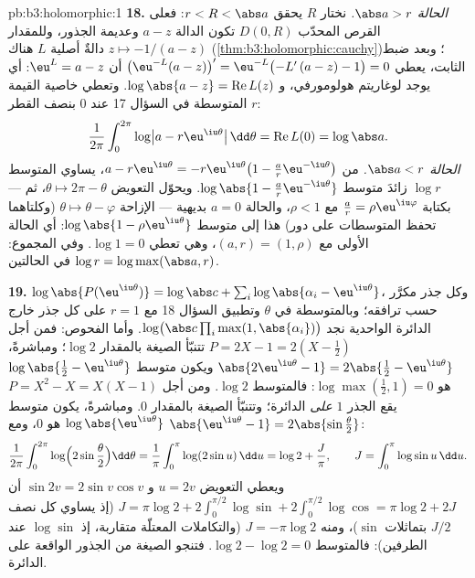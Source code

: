 \begin{solution}{pb:b3:holomorphic:1}
\textbf{18.} \emph{الحالة $\abs a > r$.} نختار $R$ يحقق $r < R
< \abs a$:
فعلى القرص المحدّب $D(0, R)$ تكون الدالة $a - z$ 
وعديمة الجذور، وللمقدار $z \mapsto -1/(a - z)$ دالةٌ أصلية $L$ هناك
(\cref{thm:b3:holomorphic:cauchy})؛ وبعد ضبط الثابت، يعطي $\bigl(\eu^{-L}(a -
z)\bigr)' = \eu^{-L}\bigl(-L'\,(a - z) - 1\bigr) = 0$ أن $\eu^L = a - z$:
أي يوجد لوغاريتم هولومورفي، و $\log\abs{a - z} = \operatorname{Re}L(z)$. وتعطي خاصية القيمة
المتوسطة في السؤال 17 عند $0$ بنصف القطر $r$:
\[
\frac1{2\pi}\int_0^{2\pi}
\log\bigl|a - r\eu^{\iu\theta}\bigr|\,\dd\theta
= \operatorname{Re}L(0) = \log\abs a .
\]
\emph{الحالة $\abs a < r$.} من $a - r\eu^{\iu\theta} =
-r\eu^{\iu\theta}\bigl(1 - \frac ar\eu^{-\iu\theta}\bigr)$، يساوي المتوسط $\log r$
زائدَ متوسط $\log\abs{1 -
\frac ar\eu^{-\iu\theta}}$. ويحوّل التعويض $\theta \mapsto
2\pi - \theta$، ثم --- بكتابة
$\frac ar =
\rho\eu^{\iu\varphi}$ مع $\rho < 1$، والحالة $a = 0$ بديهية --- الإزاحة
$\theta \mapsto \theta - \varphi$ (وكلتاهما تحفظ المتوسطات على دور) هذا إلى متوسط $\log\abs{1 - \rho\eu^{\iu\theta}}$:
أي الحالة الأولى مع $(a, r) = (1, \rho)$، وهي تعطي $\log 1 = 0$. وفي المجموع:
$\log r = \log\max(\abs a, r)$ في الحالتين.

\textbf{19.} $\log\abs{P(\eu^{\iu\theta})} = \log\abs c +
\sum_i\log\abs{\alpha_i - \eu^{\iu\theta}}$، وكل جذر مكرَّر حسب ترافقه؛ وبالمتوسطة في
$\theta$ وتطبيق السؤال 18 مع $r = 1$ على كل جذر خارج الدائرة
الواحدية نجد $\log\bigl(\abs c\prod_i\max(1,
\abs{\alpha_i})\bigr)$. وأما الفحوص: فمن أجل $P = 2X - 1 = 2(X -
\frac12)$ تتنبّأ الصيغة
بالمقدار $\log 2$؛ ومباشرةً، $\abs{2\eu^{\iu\theta} - 1} = 2\abs{\frac12 -
\eu^{\iu\theta}}$ ويكون متوسط $\log\abs{\frac12 -
\eu^{\iu\theta}}$ هو
$\log\max(\frac12, 1) = 0$: فالمتوسط $\log
2$. ومن أجل $P = X^2 - X = X(X - 1)$ يقع الجذر $1$
\emph{على} الدائرة؛ وتتنبّأ الصيغة بالمقدار $0$. ومباشرةً،
يكون متوسط $\log\abs{\eu^{\iu\theta}}$ هو $0$، ومع $\abs{\eu^{\iu\theta} - 1} = 2\abs{\sin\frac\theta2}$:
\[
\frac1{2\pi}\int_0^{2\pi}
\log\Bigl(2\sin\frac\theta2\Bigr)\dd\theta
= \frac1\pi\int_0^\pi\log(2\sin u)\,\dd u
= \log 2 + \frac J\pi,
\qquad J = \int_0^\pi\log\sin u\,\dd u .
\]
ويعطي التعويض $u = 2v$ و $\sin 2v = 2\sin v\cos v$ أن $J = \pi\log2 + 2\int_0^{\pi/2}\log\sin +
2\int_0^{\pi/2}\log\cos = \pi\log 2 + 2J$ (إذ يساوي كل نصف
$J/2$ بتماثلات $\sin$)، ومنه $J = -\pi\log 2$ (والتكاملات
المعتلّة متقاربة، إذ $\log\sin$  عند الطرفين):
فالمتوسط $\log2 - \log2 = 0$. فتنجو الصيغة من الجذور الواقعة على الدائرة.


\end{solution}
